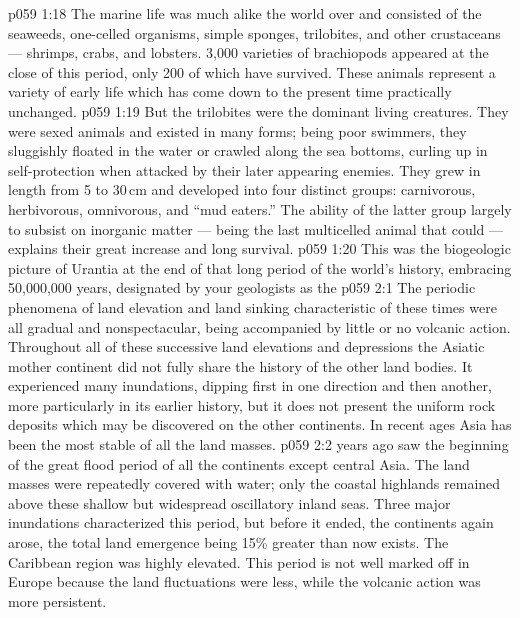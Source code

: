 \vs p059 1:18 \pc The marine life was much alike the world over and consisted of the seaweeds, one\hyp{}celled organisms, simple sponges, trilobites, and other crustaceans --- shrimps, crabs, and lobsters. 3,000 varieties of brachiopods appeared at the close of this period, only 200 of which have survived. These animals represent a variety of early life which has come down to the present time practically unchanged.
\vs p059 1:19 But the trilobites were the dominant living creatures. They were sexed animals and existed in many forms; being poor swimmers, they sluggishly floated in the water or crawled along the sea bottoms, curling up in self\hyp{}protection when attacked by their later appearing enemies. They grew in length from 5 to 30\,cm and developed into four distinct groups: carnivorous, herbivorous, omnivorous, and “mud eaters.” The ability of the latter group largely to subsist on inorganic matter --- being the last multicelled animal that could --- explains their great increase and long survival.
\vs p059 1:20 This was the biogeologic picture of Urantia at the end of that long period of the world’s history, embracing 50,000,000 years, designated by your geologists as the 
\vs p059 2:1 The periodic phenomena of land elevation and land sinking characteristic of these times were all gradual and nonspectacular, being accompanied by little or no volcanic action. Throughout all of these successive land elevations and depressions the Asiatic mother continent did not fully share the history of the other land bodies. It experienced many inundations, dipping first in one direction and then another, more particularly in its earlier history, but it does not present the uniform rock deposits which may be discovered on the other continents. In recent ages Asia has been the most stable of all the land masses.
\vs p059 2:2 \pc {} years ago saw the beginning of the great flood period of all the continents except central Asia. The land masses were repeatedly covered with water; only the coastal highlands remained above these shallow but widespread oscillatory inland seas. Three major inundations characterized this period, but before it ended, the continents again arose, the total land emergence being 15\% greater than now exists. The Caribbean region was highly elevated. This period is not well marked off in Europe because the land fluctuations were less, while the volcanic action was more persistent.
